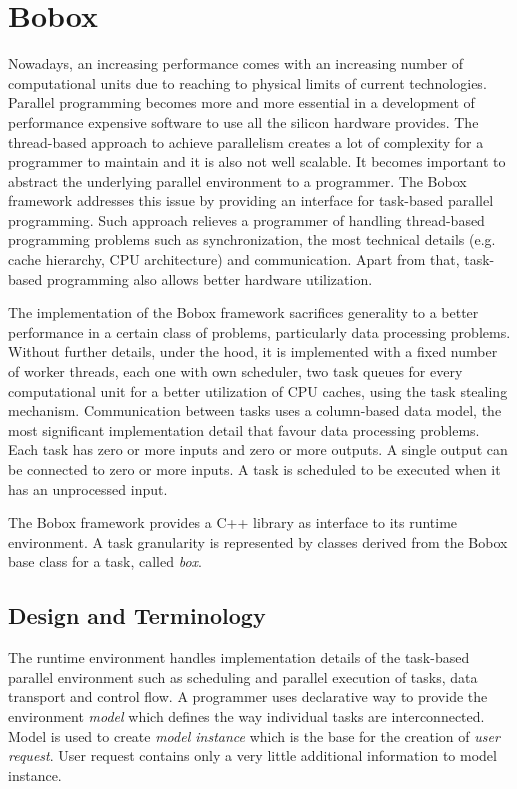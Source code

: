 \chapter{Bobox}
Nowadays, an increasing performance comes with an increasing number of computational units due to reaching to physical limits of current technologies. Parallel programming becomes more and more essential in a development of performance expensive software to use all the silicon hardware provides. The thread-based approach to achieve parallelism creates a lot of complexity for a programmer to maintain and it is also not well scalable. It becomes important to abstract the underlying parallel environment to a programmer. The Bobox framework \cite{bobox} addresses this issue by providing an interface for task-based parallel programming. Such approach relieves a programmer of handling thread-based programming problems such as synchronization, the most technical details (e.g. cache hierarchy, CPU architecture) and communication. Apart from that, task-based programming also allows better hardware utilization.

The implementation of the Bobox framework sacrifices generality to a better performance in a certain class of problems, particularly data processing problems. Without further details, under the hood, it is implemented with a fixed number of worker threads, each one with own scheduler, two task queues for every computational unit for a better utilization of CPU caches, using the task stealing mechanism. Communication between tasks uses a column-based data model, the most significant implementation detail that favour data processing problems. Each task has zero or more inputs and zero or more outputs. A single output can be connected to zero or more inputs. A task is scheduled to be executed when it has an unprocessed input.

The Bobox framework provides a C++ library as interface to its runtime environment. A task granularity is represented by classes derived from the Bobox base class for a task, called \emph{box}.

\section{Design and Terminology}
The runtime environment handles implementation details of the task-based parallel environment such as scheduling and parallel execution of tasks, data transport and control flow. A programmer uses declarative way to provide the environment \emph{model} which defines the way individual tasks are interconnected. Model is used to create \emph{model instance} which is the base for the creation of \emph{user request}. User request contains only a very little additional information to model instance.

